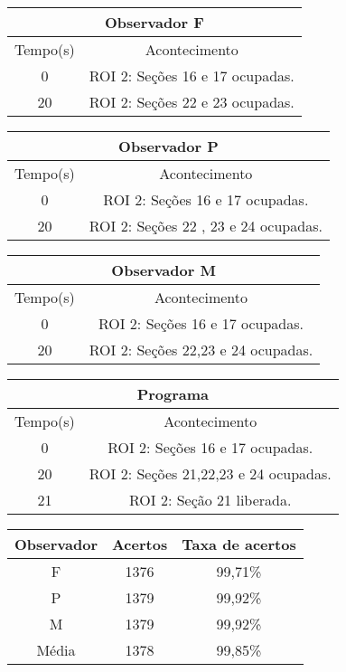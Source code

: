 \begin{center}
\begin{tabular}{|c||c|}
\hline
\multicolumn{2}{|c|}{Observador F}  \\ \hline \hline
Tempo(s) & Acontecimento \\ \hline
0 & ROI 2: Seções 16 e 17 ocupadas. \\ \hline
20 & ROI 2: Seções 22 e 23 ocupadas. \\
\hline
\end{tabular}
\end{center}

\begin{center}
\begin{tabular}{|c||c|}
\hline
\multicolumn{2}{|c|}{Observador P}  \\ \hline \hline
Tempo(s) & Acontecimento \\ \hline
0 & ROI 2: Seções 16 e 17 ocupadas. \\ \hline
20 & ROI 2: Seções 22 , 23 e 24 ocupadas. \\
\hline
\end{tabular}
\end{center}

\begin{center}
\begin{tabular}{|c||c|}
\hline
\multicolumn{2}{|c|}{Observador M}  \\ \hline \hline
Tempo(s) & Acontecimento \\ \hline
0 & ROI 2: Seções 16 e 17 ocupadas. \\ \hline
20 & ROI 2: Seções 22,23 e 24 ocupadas. \\
\hline
\end{tabular}
\end{center}

\begin{center}
\begin{tabular}{|c||c|}
\hline
\multicolumn{2}{|c|}{Programa}  \\ \hline \hline
Tempo(s) & Acontecimento \\ \hline
0 & ROI 2: Seções 16 e 17 ocupadas. \\ \hline
20 & ROI 2: Seções 21,22,23 e 24 ocupadas. \\ \hline
21 & ROI 2: Seção 21 liberada. \\
\hline
\end{tabular}
\end{center}

\begin{center}
\begin{tabular}{|c||c||c|}
\hline
Observador & Acertos & Taxa de acertos \\ \hline
F & 1376 & 99,71\% \\  \hline
P & 1379 & 99,92\% \\ \hline
M & 1379 & 99,92\% \\ \hline
Média & 1378 & 99,85\% \\
\hline
\end{tabular}
\end{center}

